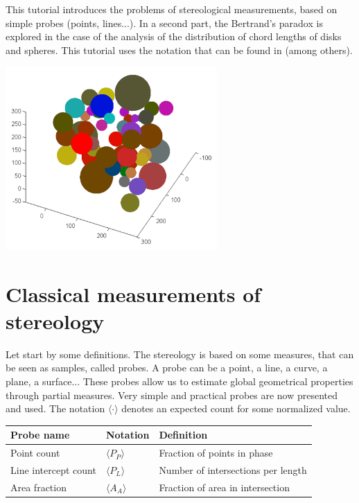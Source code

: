 \def\difficulty{3}

\begin{note}This tutorial introduces the problems of  stereological measurements, based on simple probes (points, lines...). In a second part, the Bertrand's paradox is explored in the case of the analysis of the distribution of chord lengths of disks and spheres. This tutorial uses the notation that can be found in \cite{Russ2000} (among others).
\end{note} %
\vspace*{-10pt}
\begin{center}
{\includegraphics[height=7cm]{spheres2.png}}
\end{center}\vspace*{-10pt}
\section{Classical measurements of stereology}\vspace*{-5pt}
Let start by some definitions. The stereology is based on some measures, that can be seen as samples, called probes. A probe can be a point, a line, a curve, a plane, a surface...
These probes allow us to estimate global geometrical properties through partial measures. Very simple and practical probes are now presented and used. The notation $\langle\cdot\rangle$ denotes an expected count for some normalized value.

\begin{center}
\begin{tabular}{|l|l|l|}
\hline
Probe name & Notation & Definition\\ 
\hline
Point count & $\langle P_P\rangle$ & Fraction of points in phase\\ \hline
Line intercept count & $\langle P_L\rangle$ & Number of intersections per length\\ \hline
Area fraction & $\langle A_A\rangle$ & Fraction of area in intersection\\
\hline
\end{tabular}
\end{center}


